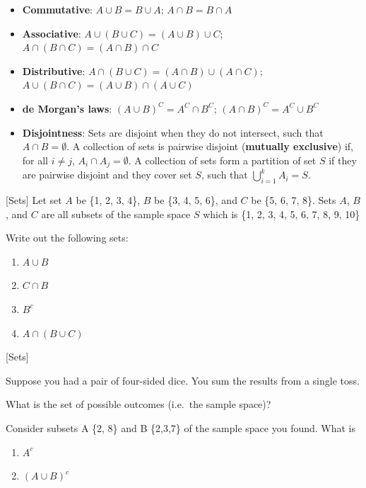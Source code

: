 \documentclass[]{book}
\providecommand{\tightlist}{%
  \setlength{\itemsep}{0pt}\setlength{\parskip}{0pt}}
\theoremstyle{definition}
\theoremstyle{definition}
\theoremstyle{definition}
\theoremstyle{remark}
\begin{document}
\begin{itemize}
\tightlist
\item
  \textbf{Commutative}: \(A \cup B = B \cup A\); \(A \cap B = B \cap A\)
\item
  \textbf{Associative}: \(A \cup (B \cup C) = (A \cup B) \cup C\); \(A \cap (B \cap C) = (A \cap B) \cap C\)
\item
  \textbf{Distributive}: \(A \cap (B \cup C) = (A \cap B) \cup (A \cap C)\); \(A \cup (B \cap C) = (A \cup B) \cap (A \cup C)\)
\item
  \textbf{de Morgan's laws}: \((A \cup B)^C = A^C \cap B^C\); \((A \cap B)^C = A^C \cup B^C\)
\item
  \textbf{Disjointness}: Sets are disjoint when they do not intersect, such that \(A \cap B = \emptyset\). A collection of sets is pairwise disjoint (\textbf{mutually exclusive}) if, for all \(i \neq j\), \(A_i \cap A_j = \emptyset\). A collection of sets form a partition of set \(S\) if they are pairwise disjoint and they cover set \(S\), such that \(\bigcup_{i = 1}^k A_i = S\).
\end{itemize}

[Sets]
\protect\hypertarget{exm:sets}{}{\label{exm:sets} {} }
Let set \(A\) be \{1, 2, 3, 4\}, \(B\) be \{3, 4, 5, 6\}, and \(C\) be \{5, 6, 7, 8\}. Sets \(A\), \(B\), and \(C\) are all subsets of the sample space \(S\) which is \{1, 2, 3, 4, 5, 6, 7, 8, 9, 10\}

Write out the following sets:

\begin{enumerate}
\def\labelenumi{\arabic{enumi}.}
\tightlist
\item
  \(A \cup B\)
\item
  \(C \cap B\)
\item
  \(B^c\)
\item
  \(A \cap (B \cup C)\)
\end{enumerate}

[Sets]
\protect\hypertarget{exr:sets1}{}{\label{exr:sets1} {} }

Suppose you had a pair of four-sided dice. You sum the results from a single toss.

What is the set of possible outcomes (i.e.~the sample space)?

Consider subsets A \{2, 8\} and B \{2,3,7\} of the sample space you found. What is

\begin{enumerate}
\def\labelenumi{\arabic{enumi}.}
\tightlist
\item
  \(A^c\)
\item
  \((A \cup B)^c\)
\end{enumerate}
\end{document}
